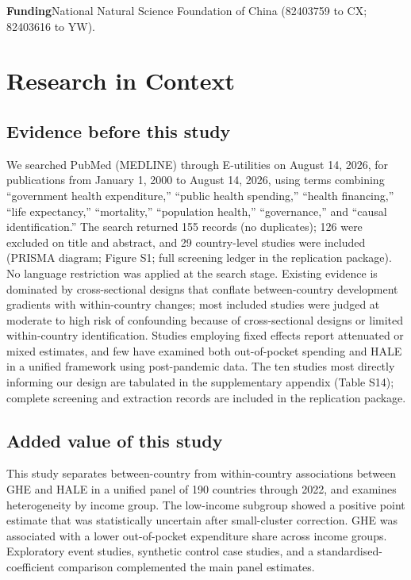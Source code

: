 \documentclass[12pt,a4paper]{article}
\begin{document}
\noindent\textbf{Funding}\quad National Natural Science Foundation of China
(82403759 to CX; 82403616 to YW).



\section*{Research in Context}

\subsection*{Evidence before this study}
We searched PubMed (MEDLINE) through E-utilities on August 14, 2026, for publications
from January 1, 2000 to August 14, 2026, using terms combining ``government health
expenditure,'' ``public health spending,'' ``health financing,'' ``life
expectancy,'' ``mortality,'' ``population health,'' ``governance,'' and
``causal identification.'' The search returned 155 records (no duplicates);
126 were excluded on title and abstract, and 29 country-level studies were
included (PRISMA diagram; Figure S1; full screening ledger in the
replication package). No language restriction was applied at the search
stage. Existing evidence is dominated by
cross-sectional designs that conflate between-country development gradients
with within-country changes; most included studies were judged at moderate
to high risk of confounding because of cross-sectional designs or limited
within-country identification. Studies employing fixed effects report
attenuated or mixed estimates, and few have examined both out-of-pocket
spending and HALE in a unified framework using post-pandemic data. The ten
studies most directly informing our design are tabulated in the
supplementary appendix (Table S14); complete screening and extraction
records are included in the replication package.

\subsection*{Added value of this study}
This study separates between-country from within-country associations between
GHE and HALE in a unified panel of 190 countries through 2022, and examines
heterogeneity by income group. The low-income subgroup showed a
positive point estimate that was statistically uncertain after small-cluster
correction. GHE was associated with a lower out-of-pocket
expenditure share across income groups. Exploratory event studies, synthetic
control case studies, and a standardised-coefficient comparison complemented
the main panel estimates.
\end{document}
